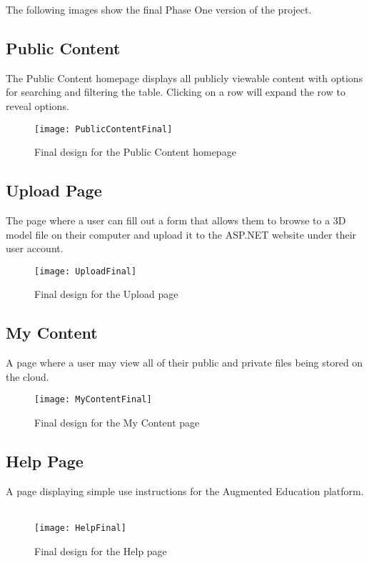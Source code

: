 \hspace{7mm}
The following images show the final Phase One version of the project. 
\subsection{Public Content}
    \hspace{7mm} The Public Content homepage displays all publicly viewable content with options for searching and filtering the table. Clicking on a row will expand the row to reveal options. 
    \label{fig:final_public_content_page}
    \begin{figure}[H]
        \centering \texttt{[image: PublicContentFinal]}
        \caption{Final design for the Public Content homepage}
    \end{figure}

\subsection{Upload Page}
    \hspace{7mm} The page where a user can fill out a form 
    that allows them to browse to a 3D model file on their computer and upload
    it to the ASP.NET website under their user account.
    \ \\
    \label{fig:final_upload_page}
    \begin{figure}[H]
        \centering \texttt{[image: UploadFinal]}
        \caption{Final design for the Upload page}
    \end{figure}

\subsection{My Content}
    \hspace{7mm}
    A page where a user may view all of their public and private files being stored 
    on the cloud.
    \ \\
    \label{fig:final_my_content_page}
    \begin{figure}[H]
        \centering \texttt{[image: MyContentFinal]}
        \caption{Final design for the My Content page}
    \end{figure}

\subsection{Help Page}
    \hspace{7mm}
    A page displaying simple use instructions for the Augmented Education platform. 
    \ \\
    \label{fig:final_help_page}
    \begin{figure}[H]
        \centering \texttt{[image: HelpFinal]}
        \caption{Final design for the Help page}
    \end{figure}

